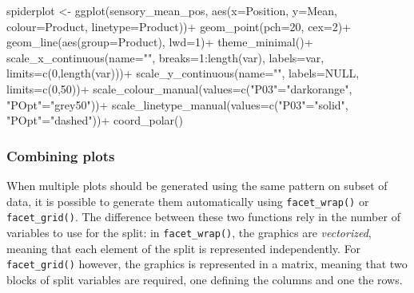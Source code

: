 \documentclass[
]{book}
\newenvironment{Shaded}{\begin{snugshade}}{\end{snugshade}}
\newcommand{\AttributeTok}[1]{\textcolor[rgb]{0.77,0.63,0.00}{#1}}
\newcommand{\ConstantTok}[1]{\textcolor[rgb]{0.00,0.00,0.00}{#1}}
\newcommand{\DecValTok}[1]{\textcolor[rgb]{0.00,0.00,0.81}{#1}}
\newcommand{\FunctionTok}[1]{\textcolor[rgb]{0.00,0.00,0.00}{#1}}
\newcommand{\NormalTok}[1]{#1}
\newcommand{\OtherTok}[1]{\textcolor[rgb]{0.56,0.35,0.01}{#1}}
\newcommand{\SpecialCharTok}[1]{\textcolor[rgb]{0.00,0.00,0.00}{#1}}
\newcommand{\StringTok}[1]{\textcolor[rgb]{0.31,0.60,0.02}{#1}}
\begin{document}
\begin{Shaded}
\begin{Highlighting}[]
\NormalTok{spiderplot }\OtherTok{\textless{}{-}} \FunctionTok{ggplot}\NormalTok{(sensory\_mean\_pos, }\FunctionTok{aes}\NormalTok{(}\AttributeTok{x=}\NormalTok{Position, }\AttributeTok{y=}\NormalTok{Mean, }\AttributeTok{colour=}\NormalTok{Product, }\AttributeTok{linetype=}\NormalTok{Product))}\SpecialCharTok{+}
  \FunctionTok{geom\_point}\NormalTok{(}\AttributeTok{pch=}\DecValTok{20}\NormalTok{, }\AttributeTok{cex=}\DecValTok{2}\NormalTok{)}\SpecialCharTok{+}
  \FunctionTok{geom\_line}\NormalTok{(}\FunctionTok{aes}\NormalTok{(}\AttributeTok{group=}\NormalTok{Product), }\AttributeTok{lwd=}\DecValTok{1}\NormalTok{)}\SpecialCharTok{+}
  \FunctionTok{theme\_minimal}\NormalTok{()}\SpecialCharTok{+}
  \FunctionTok{scale\_x\_continuous}\NormalTok{(}\AttributeTok{name=}\StringTok{""}\NormalTok{, }\AttributeTok{breaks=}\DecValTok{1}\SpecialCharTok{:}\FunctionTok{length}\NormalTok{(var), }\AttributeTok{labels=}\NormalTok{var, }\AttributeTok{limits=}\FunctionTok{c}\NormalTok{(}\DecValTok{0}\NormalTok{,}\FunctionTok{length}\NormalTok{(var)))}\SpecialCharTok{+}
  \FunctionTok{scale\_y\_continuous}\NormalTok{(}\AttributeTok{name=}\StringTok{""}\NormalTok{, }\AttributeTok{labels=}\ConstantTok{NULL}\NormalTok{, }\AttributeTok{limits=}\FunctionTok{c}\NormalTok{(}\DecValTok{0}\NormalTok{,}\DecValTok{50}\NormalTok{))}\SpecialCharTok{+}
  \FunctionTok{scale\_colour\_manual}\NormalTok{(}\AttributeTok{values=}\FunctionTok{c}\NormalTok{(}\StringTok{"P03"}\OtherTok{=}\StringTok{"darkorange"}\NormalTok{, }\StringTok{"POpt"}\OtherTok{=}\StringTok{"grey50"}\NormalTok{))}\SpecialCharTok{+}
  \FunctionTok{scale\_linetype\_manual}\NormalTok{(}\AttributeTok{values=}\FunctionTok{c}\NormalTok{(}\StringTok{"P03"}\OtherTok{=}\StringTok{"solid"}\NormalTok{, }\StringTok{"POpt"}\OtherTok{=}\StringTok{"dashed"}\NormalTok{))}\SpecialCharTok{+}
  \FunctionTok{coord\_polar}\NormalTok{()}
\end{Highlighting}
\end{Shaded}

\hypertarget{combining-plots}{%
\subsubsection{Combining plots}\label{combining-plots}}

When multiple plots should be generated using the same pattern on subset of data, it is possible to generate them automatically using \texttt{facet\_wrap()} or \texttt{facet\_grid()}. The difference between these two functions rely in the number of variables to use for the split: in \texttt{facet\_wrap()}, the graphics are \emph{vectorized}, meaning that each element of the split is represented independently. For \texttt{facet\_grid()} however, the graphics is represented in a matrix, meaning that two blocks of split variables are required, one defining the columns and one the rows.
\end{document}

